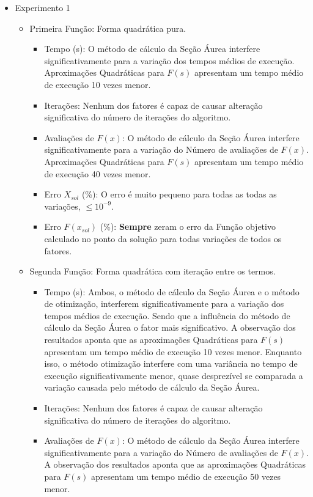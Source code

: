
\begin{itemize}
    \item Experimento 1
    \begin{itemize}
        \item Primeira Função: Forma quadrática pura.
        \begin{itemize}
        \item {Tempo (s):} O método de cálculo da Seção Áurea interfere significativamente para a variação dos tempos médios de execução. Aproximações Quadráticas para $F(s)$ apresentam um tempo médio de execução 10 vezes menor.
        \item {Iterações:} Nenhum dos fatores é capaz de causar alteração significativa do número de iterações do algoritmo. 
        \item {Avaliações de $F(x)$:} O método de cálculo da Seção Áurea interfere significativamente para a variação do Número de avaliações de $F(x)$. Aproximações Quadráticas para $F(s)$ apresentam um tempo médio de execução 40 vezes menor.
        \item {Erro $X_{sol}$ (\%):} O erro é muito pequeno para todas as todas as variações, $\leq 10^{-9}$.
        \item {Erro $F(x_{sol})$ (\%):} \textbf{Sempre} zeram o erro da Função objetivo calculado no ponto da solução para todas variações de todos os fatores. 
    \end{itemize}
        \item Segunda Função: Forma quadrática com iteração entre os termos.
        \begin{itemize}
            \item {Tempo (s):} Ambos, o método de cálculo da Seção Áurea e o método de otimização, interferem significativamente para a variação dos tempos médios de execução. Sendo que a influência do método de cálculo da Seção Áurea o fator mais significativo. A observação dos resultados aponta que as aproximações Quadráticas para $F(s)$ apresentam um tempo médio de execução 10 vezes menor. Enquanto isso, o método otimização interfere com uma variância no tempo de execução significativamente menor, quase desprezível se comparada a variação causada pelo método de cálculo da Seção Áurea. 
            \item {Iterações:} Nenhum dos fatores é capaz de causar alteração significativa do número de iterações do algoritmo.
            \item {Avaliações de $F(x)$:} O método de cálculo da Seção Áurea interfere significativamente para a variação do Número de avaliações de $F(x)$. A observação dos resultados aponta que as aproximações Quadráticas para $F(s)$ apresentam um tempo médio de execução 50 vezes menor. 

\end{itemize}
\end{itemize}
\end{itemize}

